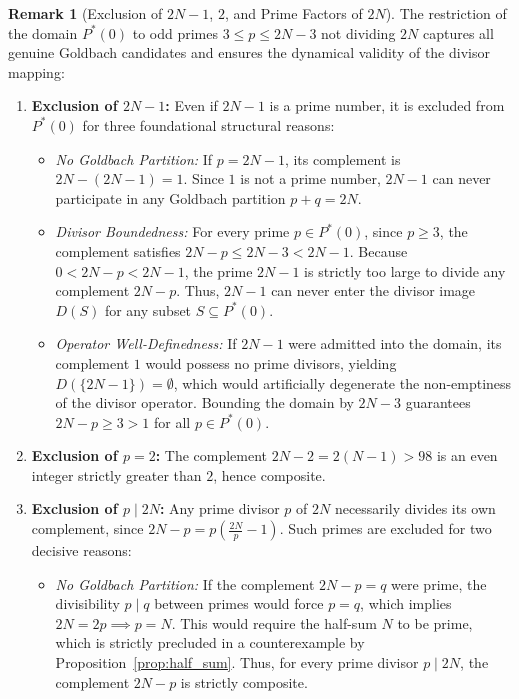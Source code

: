 \documentclass[11pt,a4paper]{article}
\theoremstyle{definition}
\newtheorem{remark}[theorem]{Remark}
\begin{document}
\begin{remark}[Exclusion of $2N-1$, $2$, and Prime Factors of $2N$]
\label{rem:exclusion_2N_minus_1}
The restriction of the domain $P^*(0)$ to odd primes $3 \le p \le 2N - 3$ not dividing $2N$ captures all genuine Goldbach candidates and ensures the dynamical validity of the divisor mapping:
\begin{enumerate}
    \item \textbf{Exclusion of $2N - 1$:} Even if $2N - 1$ is a prime number, it is excluded from $P^*(0)$ for three foundational structural reasons:
    \begin{itemize}
        \item \emph{No Goldbach Partition:} If $p = 2N - 1$, its complement is $2N - (2N - 1) = 1$. Since $1$ is not a prime number, $2N - 1$ can never participate in any Goldbach partition $p + q = 2N$.
        \item \emph{Divisor Boundedness:} For every prime $p \in P^*(0)$, since $p \ge 3$, the complement satisfies $2N - p \le 2N - 3 < 2N - 1$. Because $0 < 2N - p < 2N - 1$, the prime $2N - 1$ is strictly too large to divide any complement $2N - p$. Thus, $2N - 1$ can never enter the divisor image $D(S)$ for any subset $S \subseteq P^*(0)$.
        \item \emph{Operator Well-Definedness:} If $2N - 1$ were admitted into the domain, its complement $1$ would possess no prime divisors, yielding $D(\{2N - 1\}) = \emptyset$, which would artificially degenerate the non-emptiness of the divisor operator. Bounding the domain by $2N - 3$ guarantees $2N - p \ge 3 > 1$ for all $p \in P^*(0)$.
    \end{itemize}
    \item \textbf{Exclusion of $p = 2$:} The complement $2N - 2 = 2(N - 1) > 98$ is an even integer strictly greater than $2$, hence composite.
    \item \textbf{Exclusion of $p \mid 2N$:} Any prime divisor $p$ of $2N$ necessarily divides its own complement, since $2N - p = p\left(\frac{2N}{p} - 1\right)$. Such primes are excluded for two decisive reasons:
    \begin{itemize}
        \item \emph{No Goldbach Partition:} If the complement $2N - p = q$ were prime, the divisibility $p \mid q$ between primes would force $p = q$, which implies $2N = 2p \implies p = N$. This would require the half-sum $N$ to be prime, which is strictly precluded in a counterexample by Proposition~\ref{prop:half_sum}. Thus, for every prime divisor $p \mid 2N$, the complement $2N - p$ is strictly composite.

\end{itemize}
\end{enumerate}
\end{remark}
\end{document}
